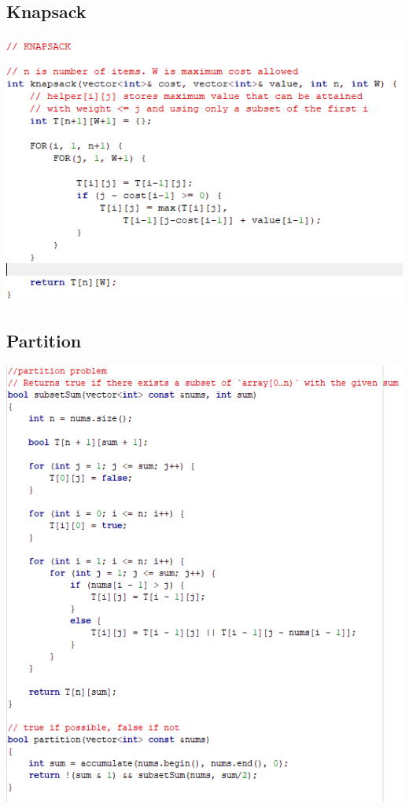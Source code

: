 \documentclass[11pt,twocolumn]{article}
\begin{document}
\subsection{Knapsack}

\includegraphics[scale=0.7]{knapsack}

\subsection{Partition}
\includegraphics[scale=0.7]{partition}
\end{document}
